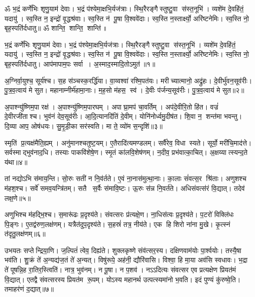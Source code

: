 ॐ भ॒द्रं कर्णे॑भिः शृणु॒याम॑ देवाः। भ॒द्रं प॑श्येमा॒क्षभि॒र्यज॑त्राः। 
स्थि॒रैरङ्गैस्तुष्टु॒वा स॑स्त॒नूभि॑। व्यशे॑म दे॒वहि॑तं॒ यदायु॑। 
स्व॒स्ति न॒ इन्द्रो॑ वृ॒द्धश्र॑वाः। स्व॒स्ति न॑ पू॒षा वि॒श्ववे॑दाः। 
स्व॒स्ति न॒स्तार्क्ष्यो॒ अरि॑ष्टनेमिः। स्व॒स्ति नो॒ बृह॒स्पति॑र्दधातु॥
ॐ शान्ति॒ शान्ति॒ शान्ति॑॥

भ॒द्रं कर्णे॑भिः शृणु॒याम॑ देवाः। भ॒द्रं प॑श्येमा॒क्षभि॒र्यज॑त्राः। 
स्थि॒रैरङ्गैस्तुष्टु॒वा स॑स्त॒नूभि॑। व्यशे॑म दे॒वहि॑तं॒ यदायु॑। 
स्व॒स्ति न॒ इन्द्रो॑ वृ॒द्धश्र॑वाः। स्व॒स्ति न॑ पू॒षा वि॒श्ववे॑दाः। 
स्व॒स्ति न॒स्तार्क्ष्यो॒ अरि॑ष्टनेमिः। स्व॒स्ति नो॒ बृह॒स्पति॑र्दधातु। 
आप॑मापाम॒पः सर्वा। अ॒स्माद॒स्मादि॒तोऽमुत॑॥१॥ 

अ॒ग्निर्वा॒युश्च॒ सूर्य॑श्च। स॒ह स॑ञ्चस्क॒रर्द्धि॑या। 
वा॒य्वश्वा॑ रश्मि॒पत॑यः। मरीच्यात्मानो॒ अद्रु॑हः। 
दे॒वीर्भु॑वन॒सूव॑रीः। पु॒त्र॒व॒त्वाय॑ मे सुत। 
महानाम्नीर्म॑हामा॒नाः। म॒ह॒सो म॑हस॒ स्व॑। 
दे॒वीः प॑र्जन्य॒सूव॑रीः। पु॒त्र॒व॒त्वाय॑ मे सुत॥२॥

अ॒पाश्न्यु॑ष्णिम॒पा रक्ष॑। अ॒पाश्न्यु॑ष्णिम॒पारघम्। 
अपाघ्रा॒मप॑ चा॒वर्तिम्। अप॑दे॒वीरि॒तो हि॑त। 
वज्रं॑ दे॒वीरजी॑ताश्च। भुव॑नं देव॒सूव॑रीः। 
आ॒दि॒त्यानदि॑तिं दे॒वीम्। योनि॑नोर्ध्वमु॒दीष॑त। 
शि॒वा न॒ शन्त॑मा भवन्तु। दि॒व्या आप॒ ओष॑धयः। 
सु॒मृ॒डी॒का सर॑स्वति। मा ते॒ व्यो॑म स॒न्दृशि॑॥३॥\anuvakamend


स्मृति॑ प्र॒त्यक्ष॑मैति॒ह्यम्। अनु॑मानश्चतुष्ट॒यम्‌। 
ए॒तैरादि॑त्यमण्डलम्‌। सर्वै॑रेव॒ विधास्यते। 
सूर्यो॒ मरी॑चि॒माद॑त्ते। सर्वस्माद्भुव॑नाद॒धि। 
तस्याः पाकवि॑शेषे॒ण। स्मृ॒तं का॑लवि॒शेष॑णम्‌। 
न॒दीव॒ प्रभ॑वात्का॒चित्‌। अ॒क्षय्यात्स्यन्द॒ते य॑था॥४॥

तां नद्योऽभि स॑माय॒न्ति। सो॒रुः सती॑ न नि॒व॑र्तते। 
ए॒वं ना॒नास॑मुत्था॒नाः। का॒लाः सं॑वत्स॒र श्रि॑ताः। 
 अणुशश्च म॑हश॒श्च। सर्वे॑ समव॒यन्त्रि॑तम्‌। 
सतै स॒र्वैः स॑मावि॒ष्टः। ऊ॒रुः स॑न्न नि॒वर्त॑ते। 
अधिसंवत्स॑रं वि॒द्यात्‌। तदेव॑ लक्ष॒णे॥५॥

अणुभिश्च म॑हद्भि॒श्च। स॒मारू॑ढः प्र॒दृश्य॑ते। 
संवत्सरः प्र॑त्यक्षे॒ण। ना॒धिस॑त्वः प्र॒दृश्य॑ते। 
प॒टरो॑ विक्लि॑धः पि॒ङ्गः। ए॒तद्व॑रुण॒लक्ष॑णम्‌। 
यत्रैत॑दुप॒दृश्य॑ते। स॒हस्रं॑ तत्र॒ नीय॑ते। 
एक हि शिरो ना॑ना मु॒खे। कृ॒त्स्नं त॑दृतु॒लक्ष॑णम्‌॥६॥

उभयतः सप्तेन्द्रिया॒णि। ज॒ल्पितं॑ त्वेव॒ दिह्य॑ते। 
शुक्लकृष्णे संव॑त्सर॒स्य। दक्षिणवाम॑योः पा॒र्श्वयोः। 
तस्यै॒षा भव॑ति। शु॒क्रं ते॑ अ॒न्यद्य॑ज॒तं ते॑ अ॒न्यत्‌। 
विषु॑रूपे॒ अह॑नी॒ द्यौरि॑वासि। विश्वा॒ हि मा॒या अव॑सि स्वधावः। 
भ॒द्रा ते॑ पूषन्नि॒ह रा॒तिर॒स्त्विति॑। नात्र॒ भुव॑नम्‌। न पू॒षा। 
न प॒शव॑। नऽऽदित्यः संवत्सर एव प्रत्यक्षेण प्रियत॑मं वि॒द्यात्‌। 
एतद्वै संवत्सरस्य प्रियत॑म रू॒पम्‌। योऽस्य महानर्थ उत्पत्स्यमा॑नो भ॒वति। 
इदं पुण्यं कु॑रुष्वे॒ति। तमाहर॑णं द॒द्यात्‌॥७॥\anuvakamend


